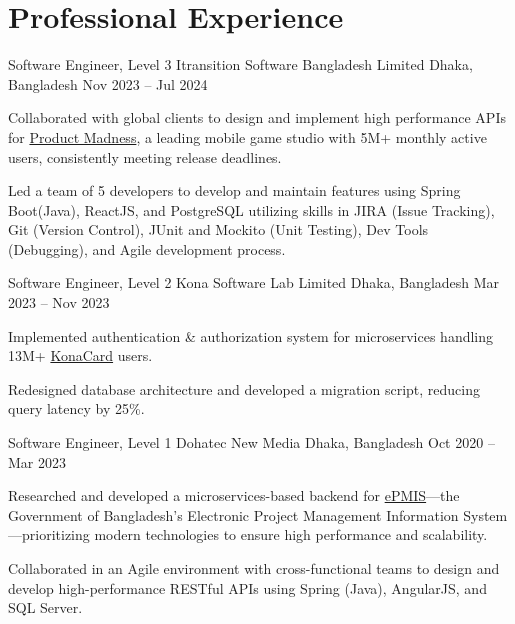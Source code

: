 \documentclass{academic-cv}
\begin{document}
\section{Professional Experience}
\begin{cventries}
    \cventry
        {Software Engineer, Level 3}
        {Itransition Software Bangladesh Limited}
        {Dhaka, Bangladesh}
        {Nov 2023 -- Jul 2024}
        \begin{cvitems}
            \item Collaborated with global clients to design and implement high performance APIs for \href{https://www.productmadness.com/}{Product Madness}, a leading mobile game studio with 5M+ monthly active users, consistently meeting release deadlines.
            \item Led a team of 5 developers to develop and maintain features using Spring Boot(Java), ReactJS, and PostgreSQL utilizing skills in JIRA (Issue Tracking), Git (Version Control), JUnit and Mockito (Unit Testing), Dev Tools (Debugging), and Agile development process.
        \end{cvitems}
    \cventry
        {Software Engineer, Level 2}
        {Kona Software Lab Limited}
        {Dhaka, Bangladesh}
        {Mar 2023 -- Nov 2023}
        \begin{cvitems}
            \item Implemented authentication \& authorization system for microservices handling 13M+ \href{https://www.konacard.co.kr/}{KonaCard} users.
            \item Redesigned database architecture and developed a migration script, reducing query latency by 25\%.
        \end{cvitems}
    \cventry
        {Software Engineer, Level 1}
        {Dohatec New Media}
        {Dhaka, Bangladesh}
        {Oct 2020 -- Mar 2023}
        \begin{cvitems}
            \item Researched and developed a microservices-based backend for \href{https://epmis.gov.bd/}{ePMIS}—the Government of Bangladesh's Electronic Project Management Information System—prioritizing modern technologies to ensure high performance and scalability.
            \item Collaborated in an Agile environment with cross-functional teams to design and develop high-performance RESTful APIs using Spring (Java), AngularJS, and SQL Server.
        \end{cvitems}
\end{cventries}
\end{document}
